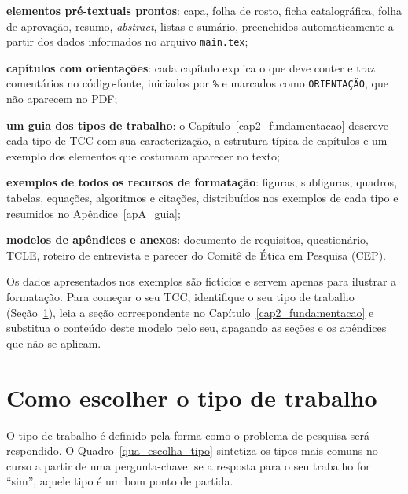 \begin{alineas}
	\item \textbf{elementos pré-textuais prontos}: capa, folha de rosto, ficha catalográfica, folha de aprovação, resumo, \textit{abstract}, listas e sumário, preenchidos automaticamente a partir dos dados informados no arquivo \texttt{main.tex};
	\item \textbf{capítulos com orientações}: cada capítulo explica o que deve conter e traz comentários no código-fonte, iniciados por \texttt{\%} e marcados como \texttt{ORIENTAÇÃO}, que não aparecem no PDF;
	\item \textbf{um guia dos tipos de trabalho}: o Capítulo~\ref{cap2_fundamentacao} descreve cada tipo de TCC com sua caracterização, a estrutura típica de capítulos e um exemplo dos elementos que costumam aparecer no texto;
	\item \textbf{exemplos de todos os recursos de formatação}: figuras, subfiguras, quadros, tabelas, equações, algoritmos e citações, distribuídos nos exemplos de cada tipo e resumidos no Apêndice~\ref{apA_guia};
	\item \textbf{modelos de apêndices e anexos}: documento de requisitos, questionário, TCLE, roteiro de entrevista e parecer do Comitê de Ética em Pesquisa (CEP).
\end{alineas}

Os dados apresentados nos exemplos são fictícios e servem apenas para ilustrar a formatação. Para começar o seu TCC, identifique o seu tipo de trabalho (Seção~\ref{sec_escolha_tipo}), leia a seção correspondente no Capítulo~\ref{cap2_fundamentacao} e substitua o conteúdo deste modelo pelo seu, apagando as seções e os apêndices que não se aplicam.

\section{Como escolher o tipo de trabalho}
\label{sec_escolha_tipo}

O tipo de trabalho é definido pela forma como o problema de pesquisa será respondido. O Quadro~\ref{qua_escolha_tipo} sintetiza os tipos mais comuns no curso a partir de uma pergunta-chave: se a resposta para o seu trabalho for \enquote{sim}, aquele tipo é um bom ponto de partida.

